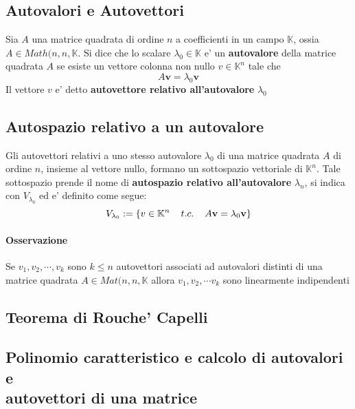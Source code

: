 \documentclass[a4paper, 10pt]{article}
\begin{document}
	
	\subsection{Autovalori e Autovettori}
	Sia $A$ una matrice quadrata di ordine $n$ a coefficienti in un campo $\mathbb{K}$, ossia $A \in Math(n,n,\mathbb{K}$. 
	Si dice che lo scalare $\lambda _0 \in \mathbb{K}$ e' un \textbf{autovalore} della matrice quadrata $A$ se esiste 
	un vettore colonna non nullo $v \in \mathbb{K}^n$ tale che \[ A\textbf{v} = \lambda _0 \textbf{v} \]
	Il vettore $v$ e' detto \textbf{autovettore relativo all'autovalore} $\lambda _0$
	\subsection{Autospazio relativo a un autovalore}
	Gli autovettori relativi a uno stesso autovalore $\lambda_0$  di una matrice quadrata $A$ di ordine $n$, 
	insieme al vettore nullo, formano un sottospazio vettoriale di $\mathbb{K}^n$. Tale sottospazio prende il nome di
	 \textbf{autospazio relativo all'autovalore} $\lambda_n$, si indica con $V_{\lambda_0}$ ed e' definito come segue:
	\[ V_{\lambda_0} := \lbrace v \in \mathbb{K}^n \hspace{0.4cm} t.c. \hspace{0.4cm} A \textbf{v} = \lambda_0 \textbf{v}
	\rbrace \]
	\paragraph*{Osservazione} Se $v_1, v_2, \cdots, v_k$ sono $k \leq n$ autovettori associati ad autovalori distinti di una
	matrice quadrata $A \in Mat(n,n,\mathbb{K}$ allora $v_1, v_2, \cdots v_k$ sono linearmente indipendenti
	
	\subsection{Teorema di Rouche' Capelli}
	
	\subsection{Polinomio caratteristico e calcolo di autovalori e \\autovettori di una matrice}
\end{document}
